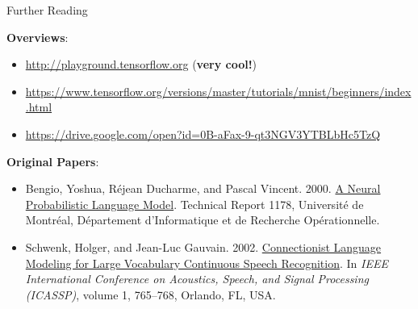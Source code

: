 \documentclass[xcolor=pdftex,x11names,table,hyperref]{beamer}
\begin{document}
\begin{frame}{Further Reading}

\textbf{Overviews}: \\[0.5em]
\begin{minipage}{1.1\textwidth}
\begin{tiny}
\begin{itemize}
	\item \url{http://playground.tensorflow.org} (\textbf{very cool!})
	\item \url{https://www.tensorflow.org/versions/master/tutorials/mnist/beginners/index.html}
	\item \url{https://drive.google.com/open?id=0B-aFax-9-qt3NGV3YTBLbHc5TzQ}
\end{itemize}
\end{tiny}
\end{minipage}

\vspace{1.0em}
\textbf{Original Papers}:
\begin{tiny}
\begin{itemize}
	\item Bengio, Yoshua, R\'{e}jean Ducharme, and Pascal Vincent. 2000. \href{http://www.iro.umontreal.ca/\~lisa/pointeurs/TR1178.pdf}{A Neural Probabilistic Language Model}. Technical Report 1178, Universit\'{e} de Montr\'{e}al, D\'{e}partement d'Informatique et de Recherche Op\'{e}rationnelle.
	\item Schwenk, Holger, and Jean-Luc Gauvain. 2002. \href{http://citeseerx.ist.psu.edu/viewdoc/summary?doi=10.1.1.18.3191}{Connectionist Language Modeling for Large Vocabulary Continuous Speech Recognition}. In \textit{IEEE International Conference on Acoustics, Speech, and Signal Processing (ICASSP)}, volume 1, 765–768, Orlando, FL, USA.
\end{itemize}
\end{tiny}
\end{frame}




\end{document}
